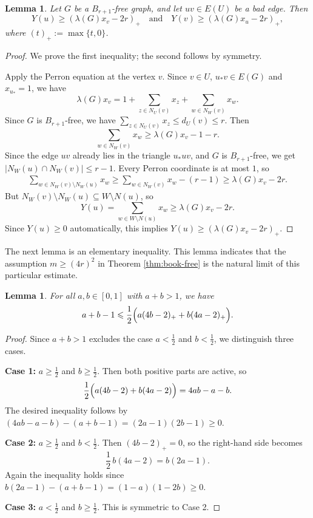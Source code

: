 \documentclass[10pt,a4paper]{amsart}
\newtheorem{lemma}[theorem]{Lemma}
\renewcommand{\le}{\leqslant}
\renewcommand{\ge}{\geqslant}
\begin{document}
\begin{lemma} \label{lem:Yu-lower}
Let $G$ be a $B_{r+1}$-free graph, and let $uv\in E(U)$ be a bad edge. Then
\[
Y(u)\ge (\lambda(G)x_v-2r)_+
\quad \text{and} \quad 
Y(v)\ge (\lambda(G)x_u-2r)_+,
\]
where $(t)_+:=\max\{t,0\}$.
\end{lemma}

\begin{proof}
We prove the first inequality; the second follows by symmetry.

Apply the Perron equation at the vertex $v$. Since $v\in U$, $u_*v\in E(G)$ and $x_{u_*}=1$, we have
\[
\lambda(G)x_v=1+\sum_{z\in N_U(v)}x_z+\sum_{w\in N_W(v)}x_w.
\]
Since $G$ is $B_{r+1}$-free, we have $\sum_{z\in N_U(v)}x_z\le d_U(v)\le r$. 
Then 
\[
\sum_{w\in N_W(v)}x_w\ge \lambda(G) x_v -1-r.
\]
Since the edge $uv$ already lies in the triangle $u_*uv$, and $G$ is $B_{r+1}$-free, we get $|N_W(u)\cap N_W(v)|\le r-1$. 
Every Perron coordinate is at most $1$, so 
\begin{align*}
\sum_{w\in N_W(v)\setminus N_W(u)}x_w
\ge \sum_{w\in N_W(v)}x_w-(r-1) 
\ge \lambda(G)x_v -2r.
\end{align*}
But $N_W(v)\setminus N_W(u)\subseteq W\setminus N(u)$, so
\[
Y(u)=\sum_{w\in W\setminus N(u)}x_w\ge \lambda(G) x_v-2r.
\]
Since $Y(u)\ge 0$ automatically, this implies
$Y(u)\ge (\lambda(G)x_v-2r)_+$. 
\end{proof}

The next lemma is an elementary inequality. 
This lemma indicates that the assumption $m\ge (4r)^2$ in Theorem \ref{thm:book-free} is the natural limit of this particular estimate. 

\begin{lemma} \label{lem:algebra}
For all $a,b\in[0,1]$ with $a+b>1$, we have 
\[
a+b-1
\le
\frac12\Bigl(a(4b-2)_+ + b(4a-2)_+\Bigr).
\]
\end{lemma}

\begin{proof}
Since $a+b>1$ excludes the case $a<\tfrac12$ and $b<\tfrac12$,  
we distinguish three cases.

\smallskip
\noindent\textbf{Case 1:} $a\ge \tfrac12$ and $b\ge \tfrac12$.
Then both positive parts are active, so
\[
\frac12\Bigl(a(4b-2)+b(4a-2)\Bigr)=4ab-a-b.
\]
The desired inequality follows by $(4ab-a-b)-(a+b-1)=(2a-1)(2b-1)\ge 0$.

\smallskip
\noindent\textbf{Case 2:} $a\ge \tfrac12$ and $b<\tfrac12$.
Then $(4b-2)_+=0$, so the right-hand side becomes
\[
\frac12\,b(4a-2)=b(2a-1).
\]
Again the inequality holds since $b(2a-1)-(a+b-1)=(1-a)(1-2b)\ge 0$.

\smallskip
\noindent\textbf{Case 3:} $a<\tfrac12$ and $b\ge \tfrac12$.
This is symmetric to Case 2.
\end{proof}
\end{document}
